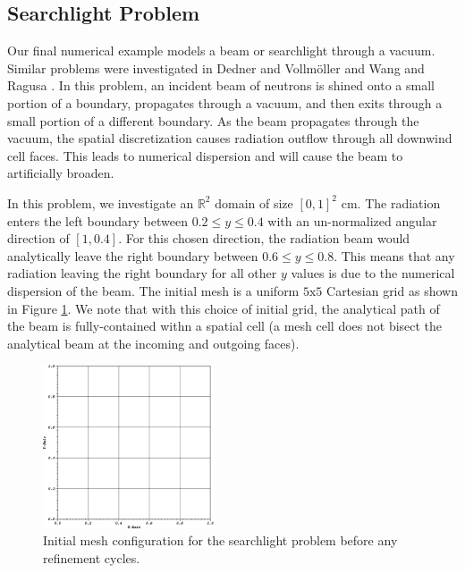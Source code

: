 \subsection{Searchlight Problem}
\label{sec::BF_Results_SL}

Our final numerical example models a beam or searchlight through a vacuum. Similar problems were investigated in Dedner and Vollm{\"o}ller \cite{dedner2002adaptive} and Wang and Ragusa \cite{wang2011standard}. In this problem, an incident beam of neutrons is shined onto a small portion of a boundary, propagates through a vacuum, and then exits through a small portion of a different boundary. As the beam propagates through the vacuum, the spatial discretization causes radiation outflow through all downwind cell faces. This leads to numerical dispersion and will cause the beam to artificially broaden.

In this problem, we investigate an $\mathbb{R}^2$ domain of size $[0,1]^2$ cm. The radiation enters the left boundary between $0.2 \leq y \leq 0.4$ with an un-normalized angular direction of $[1,0.4]$. For this chosen direction, the radiation beam would analytically leave the right boundary between $0.6 \leq y \leq 0.8$. This means that any radiation leaving the right boundary for all other $y$ values is due to the numerical dispersion of the beam. The initial mesh is a uniform $5 \text{x} 5$ Cartesian grid as shown in Figure \ref{fig::BF_Results_SL_starting_mesh}. We note that with this choice of initial grid, the analytical path of the beam is fully-contained withn a spatial cell (a mesh cell does not bisect the analytical beam at the incoming and outgoing faces). 

\begin{figure}
\centering
\includegraphics[width=0.45\textwidth]{figures/sec_BF/searchlight_starting_mesh.eps}
\caption{Initial mesh configuration for the searchlight problem before any refinement cycles.}
\label{fig::BF_Results_SL_starting_mesh}
\end{figure}

